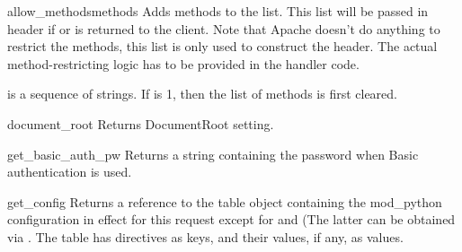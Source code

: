 \begin{methoddesc}[request]{allow_methods}{methods}
  Adds methods to the  list. This list
  will be passed in  header if
   or 
  is returned to the client. Note that Apache doesn't do anything to
  restrict the methods, this list is only used to construct the
  header. The actual method-restricting logic has to be provided in the
  handler code.

   is a sequence of strings. If  is 1, then
  the list of methods is first cleared.
\end{methoddesc}

\begin{methoddesc}[request]{document_root}{}
  Returns DocumentRoot setting.
\end{methoddesc}

\begin{methoddesc}[request]{get_basic_auth_pw}{}
  Returns a string containing the password when Basic authentication is
  used.
\end{methoddesc}

\begin{methoddesc}[request]{get_config}{}
  Returns a reference to the table object containing the mod_python
  configuration in effect for this request except for
   and  (The latter can be
  obtained via . The table has directives as
  keys, and their values, if any, as values.
\end{methoddesc}

